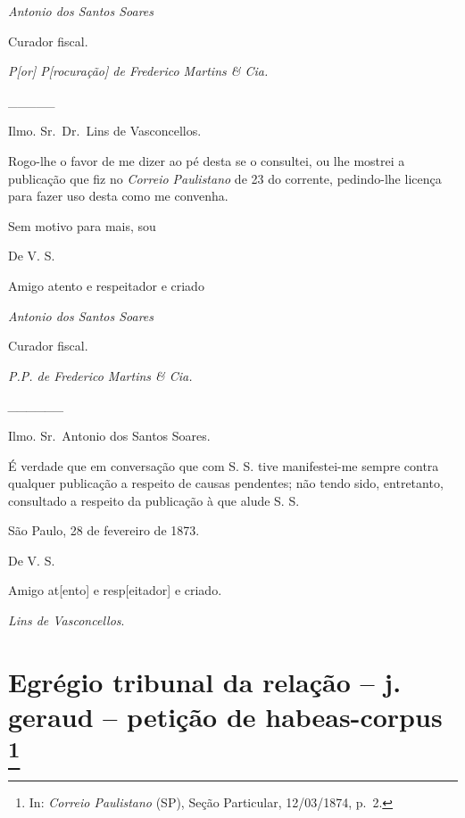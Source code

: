 \emph{Antonio dos Santos Soares}

Curador fiscal.

\emph{P{[}or{]} P{[}rocuração{]} de Frederico Martins \& Cia.}

\_\_\_\_\_

Ilmo. Sr.~Dr.~Lins de Vasconcellos.

Rogo-lhe o favor de me dizer ao pé desta se o consultei, ou lhe mostrei
a publicação que fiz no \emph{Correio Paulistano} de 23 do corrente,
pedindo-lhe licença para fazer uso desta como me convenha.

Sem motivo para mais, sou

De V. S.

Amigo atento e respeitador e criado

\emph{Antonio dos Santos Soares}

Curador fiscal.

\emph{P.P. de Frederico Martins \& Cia.}

\emph{\_\_\_\_\_\_}

Ilmo. Sr.~Antonio dos Santos Soares.

É verdade que em conversação que com S. S. tive manifestei-me sempre
contra qualquer publicação a respeito de causas pendentes; não tendo
sido, entretanto, consultado a respeito da publicação à que alude S. S.

São Paulo, 28 de fevereiro de 1873.

De V. S.

Amigo at{[}ento{]} e resp{[}eitador{]} e criado.

\emph{Lins de Vasconcellos}.

\chapter{Egrégio tribunal da relação -- j. geraud -- petição de habeas-corpus
\footnote{ In: \emph{Correio Paulistano} (SP), Seção Particular,
  12/03/1874, p.~2.}} %

